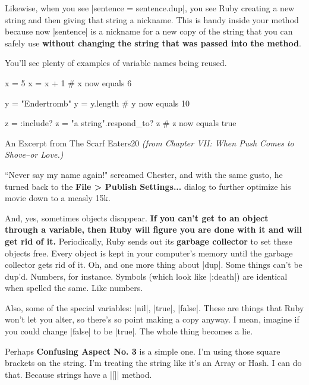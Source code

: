 \documentclass[12pt,twoside]{report}
\begin{document}
Likewise, when you see \rubyinline|sentence = sentence.dup|, 
you see Ruby creating a new string and then giving that
string a nickname.  This is handy inside your method because now
\rubyinline|sentence| is a nickname for a new copy of
the string that you can safely use {\bf without changing the string
  that was passed into the method}.

You'll see plenty of examples of variable names being reused.


\begin{rubycode}

 x = 5
 x = x + 1
 # x now equals 6

 y = "Endertromb"
 y = y.length
 # y now equals 10

 z = :include?
 z = "a string".respond_to? z
 # z now equals true

\end{rubycode}

	\begin{sidebar}{An Excerpt from The Scarf Eaters}{20}
		\textit{(from Chapter VII: When Push Comes to Shove--or Love.)}\vspace{6pt}
		
		``Never say my name again!" screamed Chester, and with the same gusto, he turned back to the \textbf{File > Publish Settings...} dialog to further optimize his movie down to a measly 15k.
	\end{sidebar}

And, yes, sometimes objects disappear.  {\bf If you can't get to an
  object through a variable, then Ruby will figure you are done with
  it and will get rid of it.}  Periodically, Ruby sends out its {\bf
  garbage collector} to set these objects free.  Every object is kept
in your computer's memory until the garbage collector gets rid of it.
Oh, and one more thing about \rubyinline|dup|.  Some
things can't be dup'd.  Numbers, for instance.  Symbols (which look
like \rubyinline|:death|) are identical when spelled
the same.  Like numbers.

Also, some of the special variables: \rubyinline|nil|,
\rubyinline|true|, \rubyinline|false|.
These are things that Ruby won't let you alter, so there's so point
making a copy anyway.  I mean, imagine if you could change
\rubyinline|false| to be
\rubyinline|true|.  The whole thing becomes a lie.

Perhaps {\bf Confusing Aspect No. 3} is a simple one.  I'm using those
square brackets on the string.  I'm treating the string like it's an
Array or Hash.  I can do that.  Because strings have a
\rubyinline|[]| method.
\end{document}
